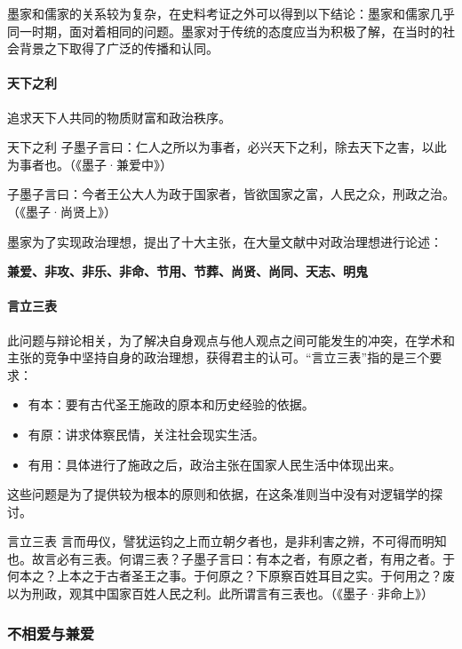 \documentclass{ctexart}
\begin{document}
墨家和儒家的关系较为复杂，在史料考证之外可以得到以下结论：墨家和儒家几乎同一时期，面对着相同的问题。墨家对于传统的态度应当为积极了解，在当时的社会背景之下取得了广泛的传播和认同。

\paragraph{天下之利}

追求天下人共同的物质财富和政治秩序。

\begin{fancybox}{天下之利}
子墨子言曰：仁人之所以为事者，必兴天下之利，除去天下之害，以此为事者也。（《墨子·兼爱中》）

子墨子言曰：今者王公大人为政于国家者，皆欲国家之富，人民之众，刑政之治。 （《墨子·尚贤上》）    
\end{fancybox}

墨家为了实现政治理想，提出了十大主张，在大量文献中对政治理想进行论述：

\textbf{兼爱、非攻、非乐、非命、节用、节葬、尚贤、尚同、天志、明鬼}

\paragraph{言立三表}

此问题与辩论相关，为了解决自身观点与他人观点之间可能发生的冲突，在学术和主张的竞争中坚持自身的政治理想，获得君主的认可。“言立三表”指的是三个要求：

\begin{itemize}
    \item 有本：要有古代圣王施政的原本和历史经验的依据。
    \item 有原：讲求体察民情，关注社会现实生活。
    \item 有用：具体进行了施政之后，政治主张在国家人民生活中体现出来。
\end{itemize}

这些问题是为了提供较为根本的原则和依据，在这条准则当中没有对逻辑学的探讨。

\begin{fancybox}{言立三表}
    言而毋仪，譬犹运钧之上而立朝夕者也，是非利害之辨，不可得而明知也。故言必有三表。何谓三表？子墨子言曰：有本之者，有原之者，有用之者。于何本之？上本之于古者圣王之事。于何原之？下原察百姓耳目之实。于何用之？废以为刑政，观其中国家百姓人民之利。此所谓言有三表也。（《墨子·非命上》） 
\end{fancybox}

\subsubsection{不相爱与兼爱}
\end{document}
